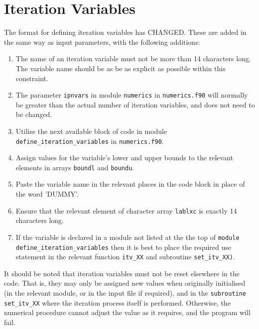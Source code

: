 \documentclass[11pt,a4paper]{report}
\begin{document}
\section{Iteration Variables}

The format for defining iteration variables has CHANGED.  These are added in the
same way as input parameters, with the following additions:

\begin{enumerate}

\item The name of an iteration variable must not be more than 14 characters long.
  The variable name should be as be as explicit as possible within this constraint.

\item The parameter \texttt{ipnvars} in module \texttt{numerics} in
  \texttt{numerics.f90} will normally be greater than 
  the actual number of iteration variables, and does not need to be changed.

\item Utilise the next available block of code in module \texttt{define\_iteration\_variables} in 
\texttt{numerics.f90}.

\item Assign values for the variable's lower and upper bounds to the relevant
  elements in arrays \texttt{boundl} and \texttt{boundu}.

\item Paste the variable name in the relevant places in the code block in place 
of the word 'DUMMY'.

\item Ensure that the relevant element of character array \texttt{lablxc} is exactly 14 
characters long.

\item If the variable is declared in a module not listed at the the top of 
\texttt{module define\_iteration\_variables} then it is best to place the required use statement
in the relevant function \texttt{itv\_XX} and subroutine \texttt{set\_itv\_XX)}.
	
\end{enumerate}

It should be noted that iteration variables must not be reset elsewhere in the
code. That is, they may only be assigned new values when originally
initialised (in the relevant module, or in the input file if required), and in
the \texttt{subroutine set\_itv\_XX} where the iteration process itself is performed.
Otherwise, the numerical procedure cannot adjust the value as it requires, and
the program will fail.
\end{document}

